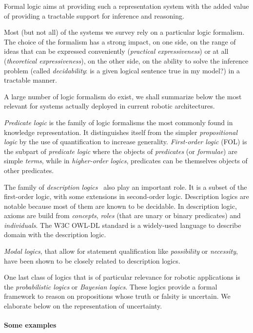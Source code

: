 \documentclass[a4paper, twocolumn]{article}
\begin{document}
Formal logic aims at providing such a representation system with the added
value of providing a tractable support for inference and reasoning.

Most (but not all) of the systems we survey rely on a particular logic
formalism. The choice of the formalism has a strong impact, on one side, on the
range of ideas that can be expressed conveniently (\emph{practical
expressiveness}) or at all (\emph{theoretical expressiveness}), on the other
side, on the ability to solve the inference problem (called
\emph{decidability}: is a given logical sentence true in my model?) in a
tractable manner.

A large number of logic formalism do exist, we shall summarize below the most
relevant for systems actually deployed in current robotic architectures.

\emph{Predicate logic} is the family of logic formalisms the most commonly
found in knowledge representation. It distinguishes itself from the simpler
\emph{propositional logic} by the use of quantification to increase generality.
\emph{First-order logic} (FOL) is the subpart of \emph{predicate logic} where the
objects of \emph{predicates} (or \emph{formulae}) are simple \emph{terms},
while in \emph{higher-order logics}, predicates can be themselves objects of
other predicates.

The family of \emph{description logics}~\cite{Baader2008} also play an
important role. It is a subset of the first-order logic, with some extensions
in second-order logic. Description logics are notable because most of them are
known to be decidable. In description logic, axioms are build from
\emph{concepts}, \emph{roles} (that are unary or binary predicates) and
\emph{individuals}. The W3C OWL-DL standard is a widely-used language to describe
domain with the description logic.

\emph{Modal logics}, that allow for statement qualification
like \emph{possibility} or \emph{necessity}, have been shown to be closely
related to description logics.


One last class of logics that is of particular relevance for robotic
applications is the \emph{probabilistic logics} or \emph{Bayesian logics}.
These logics provide a formal framework to reason on propositions whose truth
or falsity is uncertain. We elaborate below on the representation of uncertainty.


\paragraph{Some examples}
\end{document}
